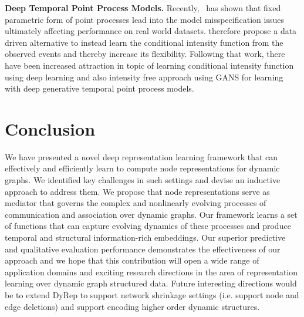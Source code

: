 \documentclass[11pt]{article}
\newcommand{\RT}[1]{{\color{blue} [Rakshit: #1]}}
\begin{document}
{\bf Deep Temporal Point Process Models.} Recently,~\cite{DuDaiTriUpaGomSon16} has shown that fixed parametric form of point processes lead into the model misspecification issues ultimately affecting performance on real world datasets. \cite{DuDaiTriUpaGomSon16} therefore propose a data driven alternative to instead learn the conditional intensity function from the observed events and thereby increase its flexibility. Following that work, there have been increased attraction in topic of learning conditional intensity function using deep learning\cite{MeiEis17} and also intensity free approach using GANS \cite{XiaFarYeYanYanSonZha17} for learning with deep generative temporal point process models.
\vspace{-2mm}
\section{Conclusion}
\vspace{-2mm}
We have presented a novel deep representation learning 
framework that can effectively and efficiently learn to compute 
node representations for dynamic graphs. We identified key challenges in such 
settings and devise an inductive approach to address them. 
We propose that node representations serve as mediator
that governs the complex and nonlinearly evolving processes of communication
and association over dynamic graphs. Our framework learns a set of functions that
can capture evolving dynamics of these processes and produce temporal 
and structural information-rich embeddings. Our superior predictive and qualitative evaluation 
performance demonstrates the effectiveness of our approach and we hope that
this contribution will open a wide range of application domains and exciting research directions in the area of representation learning
over dynamic graph structured data. Future interesting directions would be to extend DyRep to support network shrinkage settings (i.e. support node and edge deletions) and support encoding higher order dynamic structures.   
\newpage






%
\end{document}
